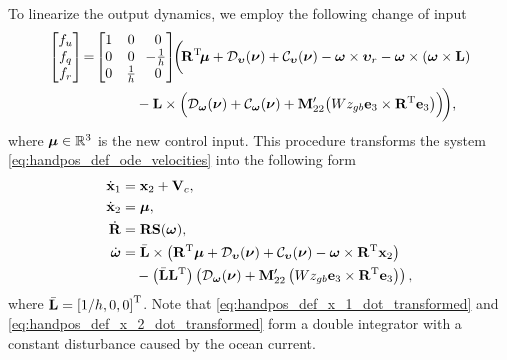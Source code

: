 To linearize the output dynamics, we employ the following change of input
\begin{align}
    \begin{bmatrix}
        f_u \\ f_q \\ f_r
    \end{bmatrix}
    \!&=\!
    \begin{bmatrix}
        1 & 0 & 0 \\ 0 & 0 & \!\!-\frac{1}{h} \\ 0 & \frac{1}{h} & 0
    \end{bmatrix}
    \!\!
    \bigg(\!\mat{R}\T\!\bs{\mu} + \mathcal{D}_{\bvel}(\vel) + \mathcal{C}_{\bvel}(\vel) - \bs{\omega} \times \bvel_r - \bs{\omega} \times \left(\bs{\omega} \times \mat{L}\right) \nonumber \\
    & \qquad \qquad - \mat{L} \times \Bigl(\mathcal{D}_{\bs{\omega}}(\vel) + \mathcal{C}_{\bs{\omega}}(\vel) + \mat{M}_{22}^{\prime}\!\left(Wz_{gb} \mat{e}_3 \times \mat{R}\T \mat{e}_3\right)\Bigr)\! \bigg),
\end{align}
where $\bm{\mu} \in \mathbb{R}^3$ is the new control input.
This procedure transforms the system \eqref{eq:handpos_def_ode_velocities} into the following form
\begin{subequations}
    \begin{align}
        \dot{\mathbf{x}}_1 &= \mathbf{x}_2 + \mathbf{V}_c, \label{eq:handpos_def_x_1_dot_transformed}\\
        \dot{\mathbf{x}}_2 &= \bm{\mu}, \label{eq:handpos_def_x_2_dot_transformed}\\
        \dot{\mathbf{R}} &= \mathbf{R}\mathbf{S}(\bm{\omega}), \label{eq:handpos_def_R_dot_CL} \\
        \dot{\bm{\omega}} &= \Bar{\mathbf{L}} \times \left(\mathbf{R}^{\mathrm{T}}\bm{\mu} + \mathcal{D}_{\bm{\upsilon}}(\bm{\nu}) + \mathcal{C}_{\bm{\upsilon}}(\bm{\nu}) - \bm{\omega} \times \mathbf{R}^{\mathrm{T}} \mathbf{x}_2\right) \label{eq:handpos_def_omega_dot_CL} \\
            & \quad - \left(\Bar{\mathbf{L}}\mathbf{L}^{\mathrm{T}}\right) \left(\mathcal{D}_{\bm{\omega}}(\bm{\nu}) + \mathbf{M}_{22}^{\prime}\left(Wz_{gb} \mathbf{e}_3 \times \mathbf{R}^{\mathrm{T}} \mathbf{e}_3\right)\right), \nonumber
    \end{align} \label{eq:handpos_def_hand_position_dynamics}
\end{subequations}
where $\Bar{\mathbf{L}} = \left[1/h, 0, 0\right]^{\mathrm{T}}$.
Note that \eqref{eq:handpos_def_x_1_dot_transformed} and \eqref{eq:handpos_def_x_2_dot_transformed} form a double integrator with a constant disturbance caused by the ocean current.

